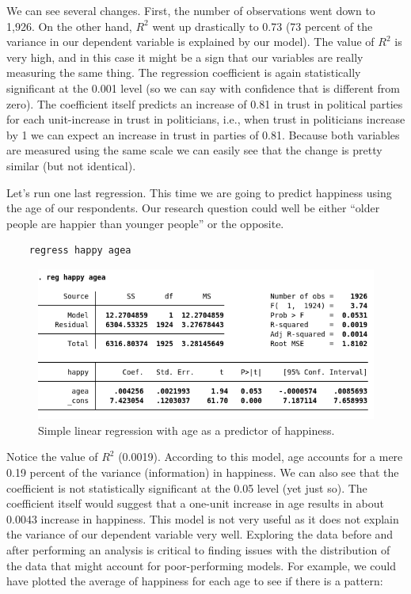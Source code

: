 \documentclass{article}
\begin{document}
We can see several changes. First, the number of observations went down to 1,926. On the other hand, $R^2$ went up drastically to 0.73 (73 percent of the variance in our dependent variable is explained by our model). The value of $R^2$ is very high, and in this case it might be a sign that our variables are really measuring the same thing. The regression coefficient is again statistically significant at the 0.001 level (so we can say with confidence that is different from zero). The coefficient itself predicts an increase of 0.81 in trust in political parties for each unit-increase in trust in politicians, i.e., when trust in politicians increase by 1 we can expect an increase in trust in parties of 0.81. Because both variables are measured using the same scale we can easily see that the change is pretty similar (but not identical).

Let's run one last regression. This time we are going to predict happiness using the age of our respondents. Our research question could well be either ``older people are happier than younger people'' or the opposite.

\begin{lstlisting}
	regress happy agea
\end{lstlisting}

\begin{figure}[H]
	\includegraphics[width=\linewidth]{Reg3.png}
	\caption{Simple linear regression with age as a predictor of happiness.}
\end{figure}

Notice the value of $R^2$ (0.0019). According to this model, age accounts for a mere 0.19 percent of the variance (information) in happiness. We can also see that the coefficient is not statistically significant at the 0.05 level (yet just so). The coefficient itself would suggest that a one-unit increase in age results in about 0.0043 increase in happiness. This model is not very useful as it does not explain the variance of our dependent variable very well. Exploring the data before and after performing an analysis is critical to finding issues with the distribution of the data that might account for poor-performing models. For example, we could have plotted the average of happiness for each age to see if there is a pattern:
\end{document}
